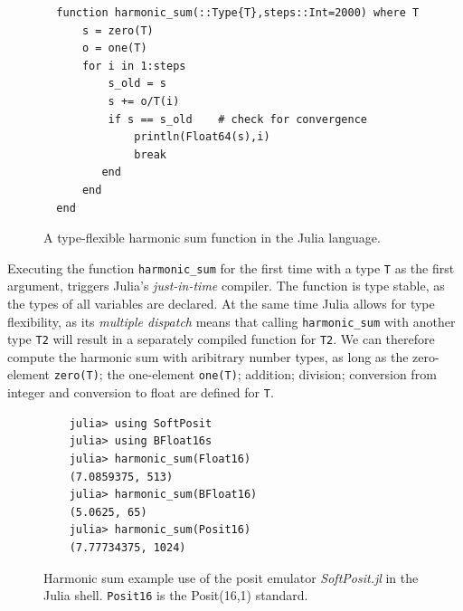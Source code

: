 \documentclass[draft]{agujournal2019}
\begin{document}
\begin{figure}[h]
%
%
%
%
\small
\begin{verbatim}
  function harmonic_sum(::Type{T},steps::Int=2000) where T
      s = zero(T)
      o = one(T)
      for i in 1:steps
          s_old = s
          s += o/T(i)
          if s == s_old    # check for convergence
              println(Float64(s),i)
              break
         end
      end
  end
\end{verbatim}
\caption{A type-flexible harmonic sum function in the Julia language.}
\label{fig:harmsum}
\end{figure}

Executing the function \texttt{harmonic\_sum} for the first time with a type \texttt{T} as the first argument, triggers Julia's \emph{just-in-time} compiler. The function is type stable, as the types of all variables are declared. At the same time Julia allows for type flexibility, as its \emph{multiple dispatch} means that calling  \texttt{harmonic\_sum} with another type \texttt{T2} will result in a separately compiled function for \texttt{T2}. We can therefore compute the harmonic sum with aribitrary number types, as long as the zero-element \texttt{zero(T)}; the one-element \texttt{one(T)}; addition; division; conversion from integer and conversion to float are defined for \texttt{T}. 

\begin{figure}[h]
\small
\begin{verbatim}
    julia> using SoftPosit
    julia> using BFloat16s
    julia> harmonic_sum(Float16)
    (7.0859375, 513)
    julia> harmonic_sum(BFloat16)
    (5.0625, 65)
    julia> harmonic_sum(Posit16)
    (7.77734375, 1024)
\end{verbatim}
\caption{Harmonic sum example use of the posit emulator \emph{SoftPosit.jl} in the Julia shell. \texttt{Posit16} is the Posit(16,1) standard.}
\label{fig:harmsum2}
\end{figure}
\end{document}
